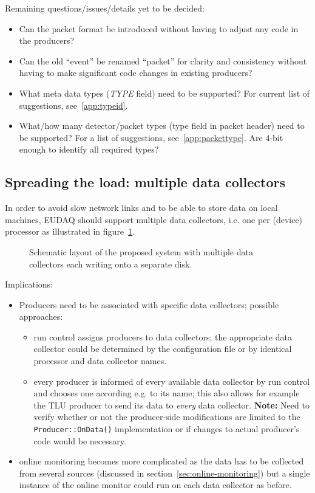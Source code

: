 \documentclass[paper=a4, fontsize=11pt]{scrartcl}	%
\numberwithin{equation}{section}		%
\numberwithin{figure}{section}			%
\numberwithin{table}{section}				%
\begin{document}
Remaining questions/issues/details yet to be decided:
\begin{itemize}
\item Can the packet format be introduced without having to adjust any
  code in the producers?
\item Can the old ``event'' be renamed ``packet'' for clarity and
  consistency without having to make significant code changes in
  existing producers?
\item What meta data types (\emph{TYPE} field) need to be supported?
  For current list of suggestions, see~\ref{app:typeid}.
\item What/how many detector/packet types (type field in packet
  header) need to be supported? For a list of suggestions,
  see~\ref{app:packettype}. Are 4-bit enough to identify all required types?
\end{itemize}


\subsection{Spreading the load: multiple data collectors}
\label{sec:datacollectors}
In order to avoid slow network links and to be able to store data on
local machines, EUDAQ should support multiple data collectors,
i.e. one per (device) processor as illustrated in figure~\ref{fig:schematiclayout}.

\begin{figure}[htbp]
  \centering
  
  \caption{Schematic layout of the proposed system with multiple data
    collectors each writing onto a separate disk.}
\label{fig:schematiclayout}
\end{figure}

Implications:
\begin{itemize}
\item Producers need to be associated with specific data collectors;
  possible approaches:
  \begin{itemize}
  \item run control assigns producers to data
    collectors; the appropriate data collector could be determined by the
    configuration file or by identical processor and data collector names.
  \item every producer is informed of every available data collector
    by run control and chooses one according e.g. to its name; this
    also allows for example the TLU producer to send its data to
    \emph{every} data collector. \textbf{Note:} Need to verify whether
    or not the producer-side modifications are limited to the
    \texttt{Producer::OnData()} implementation or if changes to actual
    producer's code would be necessary.
  \end{itemize}
\item online monitoring becomes more complicated as the data has to be
  collected from several sources (discussed in
  section~\ref{sec:online-monitoring}) but a single instance of the online monitor
  could run on each data collector as before.
\end{itemize}
\end{document}
